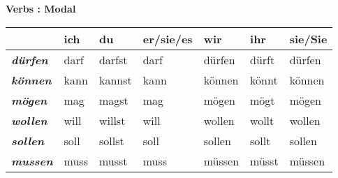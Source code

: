 \documentclass[a4paper,twocolumn,10pt]{article}
\newcommand{\tabularxtable}[3]
{

	\vspace{0.5cm}
	\nolinenumbers

	\begin{tabularx}{#1}{#2}
		#3
	\end{tabularx}

	\linenumbers
	\vspace{0.5cm}
}
\begin{document}
\textbf {Verbs : Modal}
\tabularxtable
{0.99\linewidth}
{X|X|X|X|X|X|X}
{

	&
	\cellcolor{gray-light} \textbf{ich} &
	\cellcolor{gray-light} \textbf{du} &
	\cellcolor{gray-light} \textbf{er/sie/es} &
	\cellcolor{gray-light} \textbf{wir} &
	\cellcolor{gray-light} \textbf{ihr} &
	\cellcolor{gray-light} \textbf{sie/Sie} \\

	\midrule

	\cellcolor{gray-light} \textbf{\textit{dürfen}} &
	\cellcolor{white} darf                          &
	\cellcolor{white} darfst                        &
	\cellcolor{white} darf                          &
	\cellcolor{white} dürfen                        &
	\cellcolor{white} dürft                         &
	\cellcolor{white} dürfen \\

	\cellcolor{gray-light} \textbf{\textit{können}} &
	\cellcolor{white} kann                          &
	\cellcolor{white} kannst                        &
	\cellcolor{white} kann                          &
	\cellcolor{white} können                        &
	\cellcolor{white} könnt                         &
	\cellcolor{white} können\\

	\cellcolor{gray-light} \textbf{\textit{mögen}} &
	\cellcolor{white} mag                          &
	\cellcolor{white} magst                        &
	\cellcolor{white} mag                          &
	\cellcolor{white} mögen                        &
	\cellcolor{white} mögt                         &
	\cellcolor{white} mögen\\

	\cellcolor{gray-light} \textbf{\textit{wollen}} &
	\cellcolor{white} will                          &
	\cellcolor{white} willst                        &
	\cellcolor{white} will                          &
	\cellcolor{white} wollen                        &
	\cellcolor{white} wollt                         &
	\cellcolor{white} wollen\\

	\cellcolor{gray-light} \textbf{\textit{sollen}} &
	\cellcolor{white} soll                          &
	\cellcolor{white} sollst                        &
	\cellcolor{white} soll                          &
	\cellcolor{white} sollen                        &
	\cellcolor{white} sollt                         &
	\cellcolor{white} sollen\\

	\cellcolor{gray-light} \textbf{\textit{mussen}} &
	\cellcolor{white} muss                          &
	\cellcolor{white} musst                         &
	\cellcolor{white} muss                          &
	\cellcolor{white} müssen                        &
	\cellcolor{white} müsst                         &
	\cellcolor{white} müssen\\

}
\end{document}
